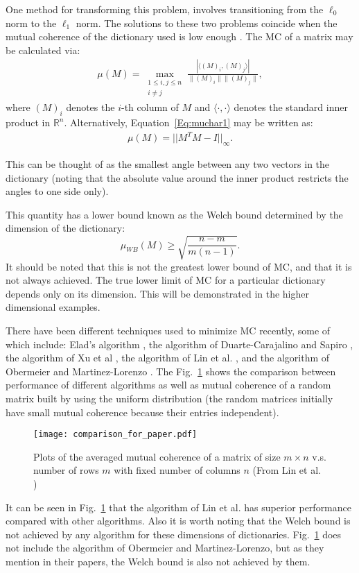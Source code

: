 \documentclass[journal]{IEEEtran}
\begin{document}
One method for transforming this problem, involves transitioning from the $\ell_0$ norm to the $\ell_1$ norm.
The solutions to these two problems coincide when the mutual coherence of the dictionary used is low 
enough \cite{Lin}. The MC of a matrix may be calculated via:
\begin{align}
\mu(M)=\max\limits_{\substack{1\leq i,j \leq n \\ i\neq j}}\frac{|\langle (M)_i, (M)_j \rangle |}{\|(M)_i\| \|(M)_j\|},
\label{Eq:muchar1}
\end{align}
where $ (M)_i$ denotes the $i$-th column of $M$ and $\langle\cdot , \cdot \rangle $ denotes the standard inner product in $\mathbb{R}^n$. 
Alternatively, Equation~\ref{Eq:muchar1} may be written as:
\begin{align}
    \mu(M) = ||M^T M - I||_\infty.
\end{align}

This can be thought of as the smallest angle between any two vectors in the dictionary (noting that
the absolute value around the inner product restricts the angles to one side only). 

This quantity
has a lower bound known as the Welch bound determined by the dimension of the dictionary:
\begin{equation}
\mu_{WB}(M) \geq \sqrt{\frac{n - m}{m(n-1)}}.
\end{equation}
It should be noted that this is not the greatest lower bound of MC, and that it is not always
achieved. The true lower limit of MC for a particular dictionary depends only on its dimension. This will be demonstrated in the higher dimensional examples.

There have been different techniques used to minimize MC recently, some of which include: Elad's algorithm \cite{Elard}, the algorithm of Duarte-Carajalino and Sapiro \cite{Sapiro}, the algorithm of Xu et al \cite{Xu}, the algorithm of Lin et al. \cite{Lin}, and the algorithm of Obermeier and Martinez-Lorenzo \cite{Obermeier}. The Fig.~\ref{Fig:comp_of_algtms} shows the comparison between performance of different algorithms as well as mutual coherence of a random matrix built by using the uniform distribution (the random matrices initially have small mutual coherence because their entries independent).  \\
\begin{figure}[!h]
\centering
\texttt{[image: comparison\_for\_paper.pdf]}
\caption{Plots of the averaged mutual coherence of a matrix of size $m \times n$ v.s. number of rows $m$ with fixed number of columns $n$ (From Lin et al. \cite{Lin})}
\label{Fig:comp_of_algtms}
\end{figure}
It can be seen in Fig.~\ref{Fig:comp_of_algtms} that the algorithm of Lin et al. has superior performance compared with other algorithms. Also it is worth noting that the Welch bound is not achieved by any algorithm for these dimensions of dictionaries.  Fig.~\ref{Fig:comp_of_algtms} does not include the algorithm of Obermeier and Martinez-Lorenzo, but as they mention in their papers, the Welch bound is also not achieved by them.
\end{document}
